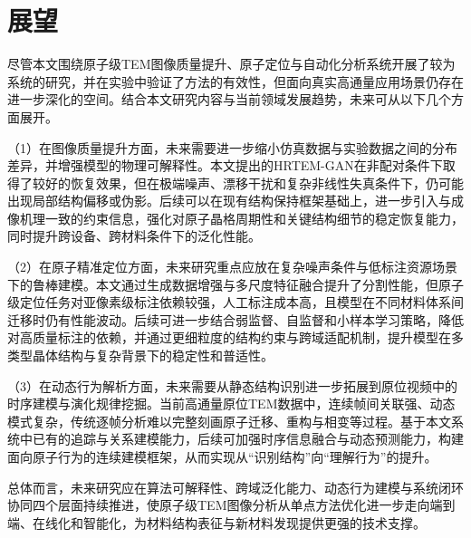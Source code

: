 \section{展望}
尽管本文围绕原子级TEM图像质量提升、原子定位与自动化分析系统开展了较为系统的研究，并在实验中验证了方法的有效性，但面向真实高通量应用场景仍存在进一步深化的空间。结合本文研究内容与当前领域发展趋势，未来可从以下几个方面展开。

（1）在图像质量提升方面，未来需要进一步缩小仿真数据与实验数据之间的分布差异，并增强模型的物理可解释性。本文提出的HRTEM-GAN在非配对条件下取得了较好的恢复效果，但在极端噪声、漂移干扰和复杂非线性失真条件下，仍可能出现局部结构偏移或伪影。后续可以在现有结构保持框架基础上，进一步引入与成像机理一致的约束信息，强化对原子晶格周期性和关键结构细节的稳定恢复能力，同时提升跨设备、跨材料条件下的泛化性能。

（2）在原子精准定位方面，未来研究重点应放在复杂噪声条件与低标注资源场景下的鲁棒建模。本文通过生成数据增强与多尺度特征融合提升了分割性能，但原子级定位任务对亚像素级标注依赖较强，人工标注成本高，且模型在不同材料体系间迁移时仍有性能波动。后续可进一步结合弱监督、自监督和小样本学习策略，降低对高质量标注的依赖，并通过更细粒度的结构约束与跨域适配机制，提升模型在多类型晶体结构与复杂背景下的稳定性和普适性。

（3）在动态行为解析方面，未来需要从静态结构识别进一步拓展到原位视频中的时序建模与演化规律挖掘。当前高通量原位TEM数据中，连续帧间关联强、动态模式复杂，传统逐帧分析难以完整刻画原子迁移、重构与相变等过程。基于本文系统中已有的追踪与关系建模能力，后续可加强时序信息融合与动态预测能力，构建面向原子行为的连续建模框架，从而实现从“识别结构”向“理解行为”的提升。

总体而言，未来研究应在算法可解释性、跨域泛化能力、动态行为建模与系统闭环协同四个层面持续推进，使原子级TEM图像分析从单点方法优化进一步走向端到端、在线化和智能化，为材料结构表征与新材料发现提供更强的技术支撑。


